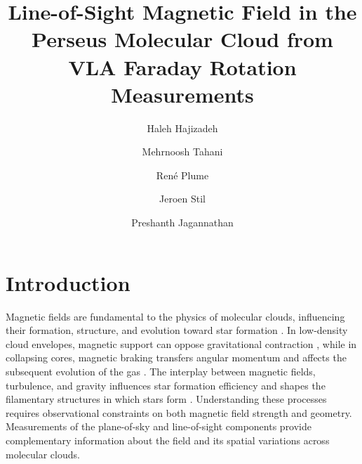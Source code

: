 \documentclass[twocolumn]{aastex701}
\begin{document}
\title{Line-of-Sight Magnetic Field in the Perseus Molecular Cloud from VLA Faraday Rotation Measurements}

\author{Haleh Hajizadeh}

\author{Mehrnoosh Tahani}

\author{Ren\'e Plume}

\author{Jeroen Stil}

\author{Preshanth Jagannathan}

\begin{abstract}

\end{abstract}



\section{Introduction}
\label{sec:intro}

Magnetic fields are fundamental to the physics of molecular clouds, influencing their formation, structure, and evolution toward star formation \citep{mckee2007,crutcher2012magnetic,hennebelle2019role,pattle2023}. In low-density cloud envelopes, magnetic support can oppose gravitational contraction \citep{mouschovias1976nonhomologous}, while in collapsing cores, magnetic braking transfers angular momentum and affects the subsequent evolution of the gas \citep{pudritz2019}. The interplay between magnetic fields, turbulence, and gravity influences star formation efficiency \citep{krumholz2019,federrath2015inefficient} and shapes the filamentary structures in which stars form \citep{li2014link}. Understanding these processes requires observational constraints on both magnetic field strength and geometry. Measurements of the plane-of-sky and line-of-sight components provide complementary information about the field and its spatial variations across molecular clouds.
\end{document}
